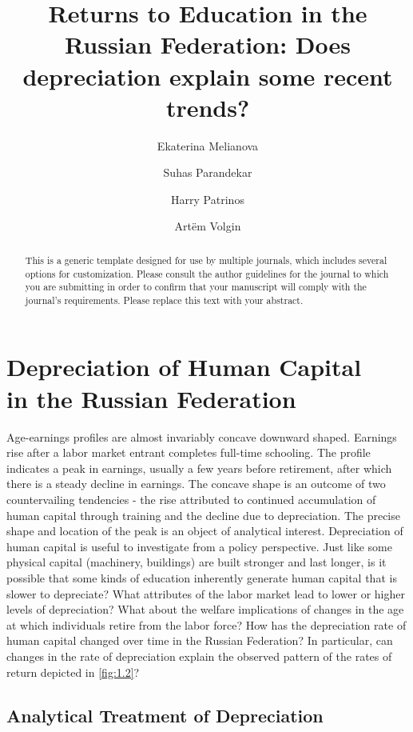 \documentclass[alpha-refs]{wiley-article-02b}
\title{Returns to Education in the Russian Federation: Does depreciation explain some recent trends?}
\author[*]{Ekaterina Melianova}
\author[*]{\hspace{-1em}Suhas Parandekar}
\author[*]{\hspace{-1em}Harry Patrinos}
\author[*]{\hspace{-1em}Art\"{e}m Volgin}
\affil[*]{Education Global Practice, Europe and Central Asia}
\begin{document}
\maketitle

\begin{abstract}
This is a generic template designed for use by multiple journals, which includes several options for customization. Please consult the author guidelines for the journal to which you are submitting in order to confirm that your manuscript will comply with the journal's requirements. Please replace this text with your abstract.

\end{abstract}


\section{Depreciation of Human Capital \\ in the Russian Federation}

Age-earnings profiles are almost invariably concave downward shaped. Earnings rise after a labor market entrant completes full-time schooling. The profile indicates a peak in earnings, usually a few years before retirement, after which there is a steady decline in earnings. The concave shape is an outcome of two countervailing tendencies - the rise attributed to continued accumulation of human capital through training and the decline due to depreciation. The precise shape and location of the peak is an object of analytical interest. Depreciation of human capital is useful to investigate from a policy perspective. Just like some physical capital (machinery, buildings) are built stronger and last longer, is it possible that some kinds of education inherently generate human capital that is slower to depreciate? What attributes of the labor market lead to lower or higher levels of depreciation? What about the welfare implications of changes in the age at which individuals retire from the labor force? How has the depreciation rate of human capital changed over time in the Russian Federation? In particular, can changes in the rate of depreciation explain the observed pattern of the rates of return depicted in \ref{fig:1.2}?  

\subsection{Analytical Treatment of Depreciation} 
\end{document}
